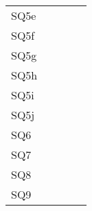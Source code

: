 \documentclass[10pt,letterpaper,oneside]{article}
\begin{document}
\begin{table}[]
\begin{tabular}{lllll}
			SQ5e                               &                                           &                                        &                                      &                                                                                               \\
			SQ5f                               &                                           &                                        &                                      &                                                                                               \\
			SQ5g                               &                                           &                                        &                                      &                                                                                               \\
			SQ5h                               &                                           &                                        &                                      &                                                                                               \\
			SQ5i                               &                                           &                                        &                                      &                                                                                               \\
			SQ5j                               &                                           &                                        &                                      &                                                                                               \\
			SQ6                                &                                           &                                        &                                      &                                                                                               \\
			SQ7                                &                                           &                                        &                                      &                                                                                               \\
			SQ8                                &                                           &                                        &                                      &                                                                                               \\
			SQ9                                &                                           &                                        &                                      &                                                                                              
		\end{tabular}
	\end{table}
\end{document}
